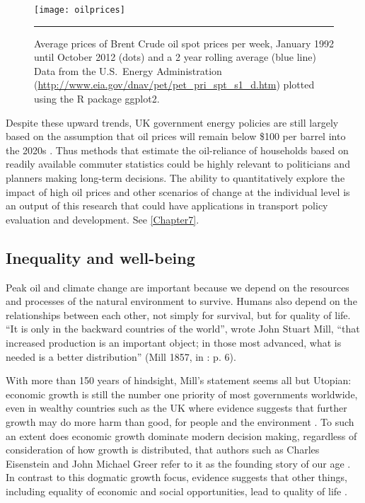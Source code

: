  \begin{figure}[htbp]
  \centerline{
    \texttt{[image: oilprices]}}
    \rule{35em}{0.5pt}
  \caption[Average prices of Brent Crude oil spot prices, 1992 -- 2012]
  {Average prices of Brent Crude oil spot prices per week,
January 1992 until October 2012 (dots) and a 2 year rolling average
(blue line) Data from the U.S.~Energy
Administration (\url{http://www.eia.gov/dnav/pet/pet_pri_spt_s1_d.htm})
plotted using the R package ggplot2.}
  \label{fig:oilprice}
\end{figure}

Despite these upward trends, UK government energy policies
are still largely based on the assumption that oil prices will
remain below \$100 per barrel into the 2020s \citep{UKERC2010}.
Thus methods that estimate the oil-reliance of households based
on readily available commuter statistics could be highly relevant
to politicians and planners making long-term decisions. The ability to
quantitatively explore
the impact of high oil prices and other scenarios of change
at the individual level is an output of this
research that could have applications in transport policy evaluation and 
development. See \cref{Chapter7}.

\subsection{Inequality and well-being}
Peak oil and climate change are important because we
depend on the resources and processes of the natural environment to survive.
Humans also depend on the relationships between each other, not simply for
survival, but for quality of life. ``It is only in the backward countries of
the world'', wrote John Stuart Mill, ``that increased production is an
important object; in those most advanced, what is needed is a better
distribution'' (Mill 1857, in \citealt{Perman2003}: p. 6).

With more than 150 years of hindsight, Mill's statement seems all but
Utopian: economic growth is still the number one priority of most governments
worldwide, even in wealthy countries such as the UK where evidence
suggests that further growth may do more harm than good, for people and
the environment \citep{Latouche2008}.
To such an extent does economic growth dominate modern decision making,
regardless of consideration of how growth is distributed,
that authors such as Charles Eisenstein and John Michael Greer
refer to it as the founding story of our age \citep{Eisenstein2011, Greer2009}.
In contrast to this dogmatic growth focus, evidence suggests that
other things, including equality of economic and social opportunities, lead
to quality of life \citep{Jackson2008, Jackson2009}.

